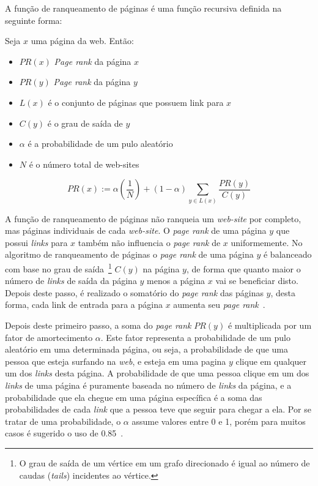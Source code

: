 A função de ranqueamento de páginas é uma função recursiva definida na seguinte forma:

Seja $x$ uma página da web. Então:
\begin{itemize}
    \item $PR(x)$ \textit{Page rank} da página  $x$
    \item $PR(y)$ \textit{Page rank} da página  $y$
    \item $L(x)$ é o conjunto de páginas que possuem link para $x$
    \item $C(y)$ é o grau de saída de $y$
    \item $\alpha$ é a probabilidade de um pulo aleatório
    \item $N$ é o número total de web-sites
\end{itemize}
\[\displaystyle PR(x) := \alpha \left ( \frac{1}{N} \right ) + (1-\alpha) \sum_{y\in L(x)} \frac{PR(y)}{C(y)}\]

A função de ranqueamento de páginas não ranqueia um \textit{web-site} por completo, mas páginas individuais de cada \textit{web-site}. O \textit{page rank} de uma página $y$ que possui \textit{links} para $x$ também não influencia o \textit{page rank} de $x$ uniformemente. No algoritmo de ranqueamento de páginas o \textit{page rank} de uma página $y$ é balanceado com base no grau de saída~\footnote{O grau de saída de um vértice em um grafo direcionado é igual ao número de caudas (\textit{tails}) incidentes ao vértice.} $C(y)$ na página $y$, de forma que quanto maior o número de \textit{links} de saída da página $y$ menos a página $x$ vai se beneficiar disto. Depois deste passo, é realizado o somatório do \textit{page rank} das páginas $y$, desta forma, cada link de entrada para a página $x$ aumenta seu \textit{page rank}~\cite{pageRank}.

Depois deste primeiro passo, a soma do \textit{page rank} $PR(y)$ é multiplicada por um fator de amortecimento $\alpha$. Este fator representa a probabilidade de um pulo aleatório em uma determinada página, ou seja, a probabilidade de que uma pessoa que esteja surfando na \textit{web}, e esteja em uma pagina $y$ clique em qualquer um dos \textit{links} desta página. A probabilidade de que uma pessoa clique em um dos \textit{links} de uma página é puramente baseada no número de \textit{links} da página, e a probabilidade que ela chegue em uma página específica é a soma das probabilidades de cada \textit{link} que a pessoa teve que seguir para chegar a ela. Por se tratar de uma probabilidade, o $\alpha$ assume valores entre 0 e 1, porém para muitos casos é sugerido o uso de 0.85~\cite{pageRank}. 

